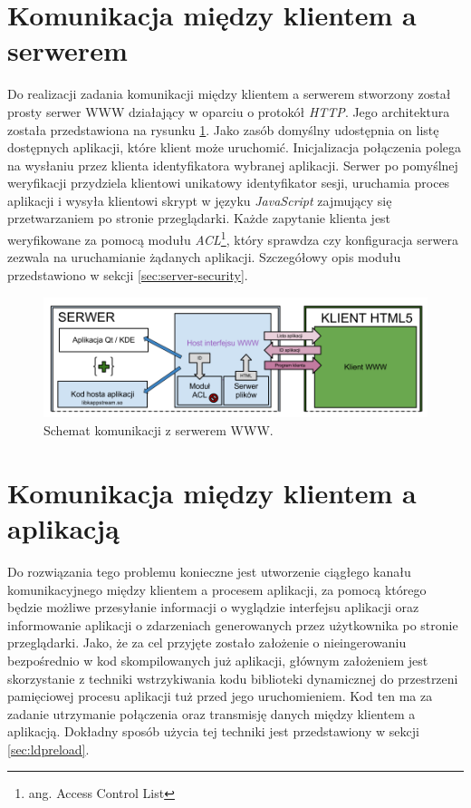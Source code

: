 \section{Komunikacja między klientem a serwerem}

Do realizacji zadania komunikacji między klientem a serwerem stworzony został prosty serwer WWW działający w oparciu o protokół \emph{HTTP}. Jego architektura została przedstawiona na rysunku \ref{fig:arch-www}. Jako zasób domyślny udostępnia on listę dostępnych aplikacji, które klient może uruchomić. Inicjalizacja połączenia polega na wysłaniu przez klienta identyfikatora wybranej aplikacji. Serwer po pomyślnej weryfikacji przydziela klientowi unikatowy identyfikator sesji, uruchamia proces aplikacji i wysyła klientowi skrypt w języku \emph{JavaScript} zajmujący się przetwarzaniem po stronie przeglądarki. Każde zapytanie klienta jest weryfikowane za pomocą modułu \emph{ACL}\footnote{ang. Access Control List}, który sprawdza czy konfiguracja serwera zezwala na uruchamianie żądanych aplikacji. Szczegółowy opis modułu przedstawiono w sekcji \ref{sec:server-security}.

\begin{figure}[H]
\centering
\includegraphics[width=1.0\linewidth]{img/arch-www}
\caption{Schemat komunikacji z serwerem WWW.}
\label{fig:arch-www}
\end{figure}

\section{Komunikacja między klientem a aplikacją}

Do rozwiązania tego problemu konieczne jest utworzenie ciągłego kanału komunikacyjnego między klientem a procesem aplikacji, za pomocą którego będzie możliwe przesyłanie informacji o wyglądzie interfejsu aplikacji oraz informowanie aplikacji o zdarzeniach generowanych przez użytkownika po stronie przeglądarki. Jako, że za cel przyjęte zostało założenie o nieingerowaniu bezpośrednio w kod skompilowanych już aplikacji, głównym założeniem jest skorzystanie z techniki wstrzykiwania kodu biblioteki dynamicznej do przestrzeni pamięciowej procesu aplikacji tuż przed jego uruchomieniem. Kod ten ma za zadanie utrzymanie połączenia oraz transmisję danych między klientem a aplikacją. Dokładny sposób użycia tej techniki jest przedstawiony w sekcji \ref{sec:ldpreload}.


